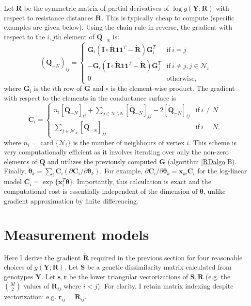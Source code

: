 \documentclass[11pt]{article}
\DeclareMathOperator*{\card}{card}
\newcommand{\mat}[1]{\mathbf{#1}}
\begin{document}
Let $\dot{\mat R}$ be the symmetric matrix of partial derivatives of $\log g(\mat Y; \mat R)$
with respect to resistance distances $\mat R$. This is typically cheap to
compute (specific examples are given below). Using the chain rule in reverse, 
the gradient with respect to the $i,j$th element of $\mat Q_{-N}$ is:
\begin{equation}
  \label{qdiff}
  (\dot{\mat Q}_{-N})_{ij} = \begin{cases} 
    \mat G_i ( \mat I \circ \dot{\mat R} \mat 1 \mat 1^T - \dot{\mat R} ) \mat G_i^T & \mathrm{if~} i = j \\
    -\mat G_i ( \mat I \circ \dot{\mat R} \mat 1 \mat 1^T - \dot{\mat R} ) \mat G_j^T & \mathrm{if~} i \neq j, j \in \mathcal{N}_i \\
    0 & \mathrm{otherwise,}
  \end{cases}
\end{equation}
where $\mat G_i$ is the $i$th row of $\mat G$ and $\circ$ is the
element-wise product. The gradient with respect to the elements in the
conductance surface is
\[
  \dot{\mat C}_i = \begin{cases}
    n_i [\dot{\mat Q}_{-N}]_{ii} + \sum_{j \in \mathcal{N}_i \setminus N } [\dot{\mat Q}_{-N}]_{jj} - 2 [\dot{\mat Q}_{-N}]_{ij} & \mathrm{if~} i \neq N \\
    \sum_{j \in \mathcal{N}_N} [\dot{\mat Q}_{-N}]_{jj} & \mathrm{if~} i = N,
  \end{cases}
\]
where $n_i = \card \{ \mathcal{N}_i \}$ is the number of neighbours of vertex $i$. This scheme
is very computationally efficient as it involves iterating over only the
non-zero elements of $\mat Q$ and utilizes the previously computed 
$\mat G$ (algorithm \ref{RDalgo}B). Finally, 
$\dot{\bm \theta}_k = \sum_i \dot{\mat C}_i (\partial{\mat C_i} / \partial{\bm \theta_k})$. 
For example, $\partial{\mat C_i} / \partial{\bm \theta_k} = \mat x_{ki} \mat C_i$
for the log-linear model $\mat C_i = \exp\{ \mat x_i^T \bm \theta \}$. Importantly,
this calculation is exact and the computational cost is essentially independent of the
dimension of $\bm \theta$, unlike gradient approximation by finite differencing.

\section{Measurement models}

Here I derive the gradient $\dot{\mat R}$ required in the previous section for
four reasonable choices of $g(\mat Y; \mat R)$.  Let $\mat S$ be a genetic
dissimilarity matrix calculated from genotypes $\mat Y$.  Let $\mat s, \mat r$ be
the lower triangular vectorizations of $\mat S, \mat R$ (e.g. the ${M \choose 2}$ values of $\mat R_{ij}$ 
where $i < j$). For clarity, I retain matrix indexing despite vectorization: e.g. $\mat r_{ij} =
\mat R_{ij}$.
\end{document}
